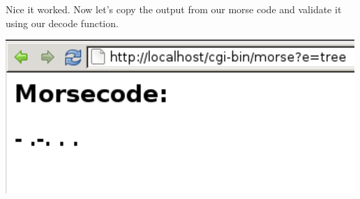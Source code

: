 Nice it worked. Now let's copy the output from our morse code and validate it using our decode function.

 
    \includegraphics{../test31.png}
     